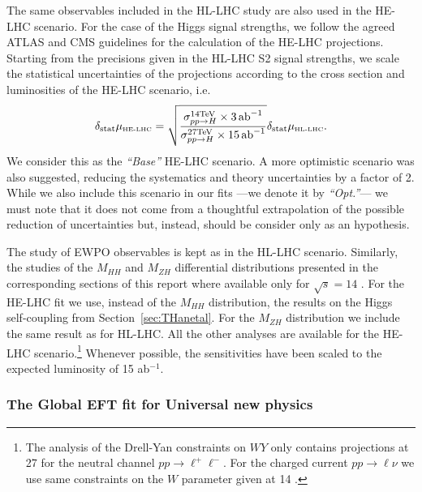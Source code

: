 The same observables included in the HL-LHC study are also used in the HE-LHC scenario. 
For the case of the Higgs signal strengths, we follow the agreed ATLAS and CMS guidelines for the calculation of
the HE-LHC projections.
Starting from the precisions given in the HL-LHC S2 signal strengths, we scale the statistical uncertainties of the projections
according to the cross section and luminosities of the HE-LHC scenario, i.e.
%
\begin{equation}
\delta_{\mathrm{stat}} \mu_{\mbox{\tiny HE-LHC}} = \sqrt{\frac{\sigma_{pp\to H}^{\mathrm{14 \text{TeV}}}\times 3~\!\mathrm{ab}^{-1}}{\sigma_{pp\to H}^{\mathrm{27 \text{TeV}}}\times 15~\! \mathrm{ab}^{-1}}} \delta_{\mathrm{stat}} \mu_{\mbox{\tiny HL-LHC}} .
\end{equation}
%
We consider this as the {\it ``Base''} HE-LHC scenario. A more optimistic scenario was also suggested, reducing the 
systematics and theory uncertainties by a factor of 2. While we also include this scenario in our fits ---we denote it by {\it ``Opt.''}---
we must note that it does not come from a thoughtful extrapolation of the possible reduction of uncertainties but, instead, 
should be consider only as an hypothesis.

The study of EWPO observables is kept as in the HL-LHC scenario. Similarly, the studies of the $M_{HH}$ and $M_{ZH}$ differential distributions presented in the corresponding sections of this report where available only for $\sqrt{s}=14$ \UTeV. For the HE-LHC fit we use, instead of the $M_{HH}$ distribution, the results on the Higgs self-coupling from Section~\ref{sec:THanetal}. For  the $M_{ZH}$ distribution we include the same result as for HL-LHC. All the other analyses are available for the HE-LHC scenario.\footnote{The analysis of the Drell-Yan constraints on $WY$ only contains projections at 27 \UTeV for the neutral channel $pp\to \ell^+ \ell^-$. For the charged current $pp\to \ell \nu$ we use same constraints on the $W$ parameter given at 14 \UTeV.} Whenever possible, the sensitivities have been scaled to the
expected luminosity of 15 ab$^{-1}$.


\subsubsection*{The Global EFT fit for Universal new physics}
\label{sec:results}

